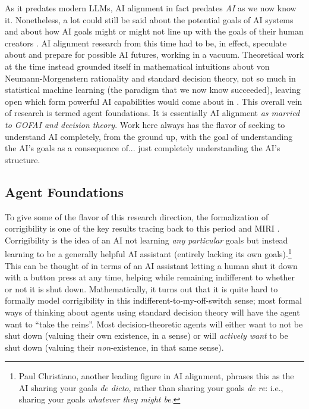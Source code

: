 As it predates modern LLMs, AI alignment in fact predates \emph{AI} as we now
know it. Nonetheless, a lot could still be said about the potential goals of AI
systems and about how AI goals might or might not line up with the goals of
their human creators
\cite{bostrom2014superintelligence,omohundro2008drives,yudkowsky2008factor}. AI
alignment research from this time had to be, in effect, speculate about and
prepare for possible AI futures, working in a vacuum. Theoretical work at the
time instead grounded itself in mathematical intuitions about von
Neumann-Morgenstern rationality \cite{von1944games} and standard decision
theory, not so much in statistical machine learning (the paradigm that we now
know succeeded), leaving open which form powerful AI capabilities would come
about in \cite{soares2015corrigibility}. This overall vein of research is
termed agent foundations. It is essentially AI alignment \emph{as married to
GOFAI and decision theory}. Work here always has the flavor of seeking to
understand AI completely, from the ground up, with the goal of understanding
the AI's goals as a consequence of... just completely understanding the AI's
structure.

\subsection{Agent Foundations}
To give some of the flavor of this research direction, the formalization of
corrigibility is one of the key results tracing back to this period and MIRI
\cite{soares2015corrigibility}. Corrigibility is the idea of an AI not learning
\emph{any particular} goals but instead learning to be a generally helpful AI
assistant (entirely lacking its own goals).\footnote{Paul Christiano, another
leading figure in AI alignment, phrases this as the AI sharing your goals
\emph{de dicto}, rather than sharing your goals \emph{de re}: i.e., sharing
your goals \emph{whatever they might be}.} This can be thought of in terms of
an AI assistant letting a human shut it down with a button press at any time,
helping while remaining indifferent to whether or not it is shut down.
Mathematically, it turns out that it is quite hard to formally model
corrigibility in this indifferent-to-my-off-switch sense; most formal ways of
thinking about agents using standard decision theory will have the agent want
to ``take the reins''. Most decision-theoretic agents will either want to not
be shut down (valuing their own existence, in a sense) or will \emph{actively
want} to be shut down (valuing their \emph{non}-existence, in that same sense).

